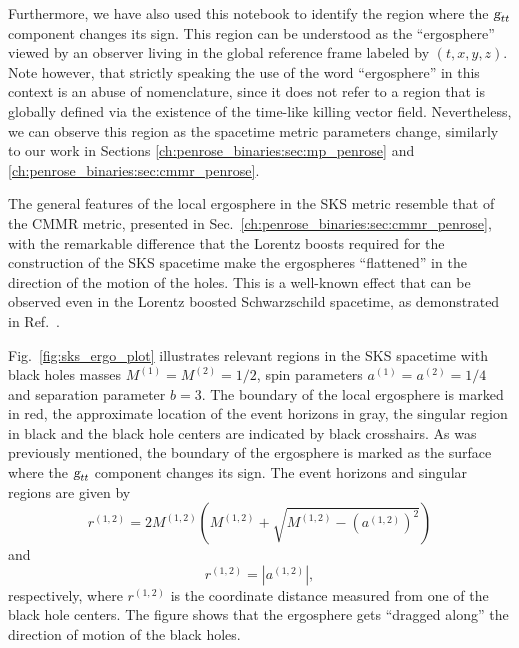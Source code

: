 Furthermore, we have also used this notebook to identify the region where the $\mtrtens{t}{t}$ component changes its sign. This region can be understood as the ``ergosphere'' viewed by an observer living in the global reference frame labeled by $(t,x,y,z)$. Note however, that strictly speaking the use of the word ``ergosphere'' in this context is an abuse of nomenclature, since it does not refer to a region that is globally defined via the existence of the time-like killing vector field. Nevertheless, we can observe this region as the spacetime metric parameters change, similarly to our work in Sections \ref{ch:penrose_binaries:sec:mp_penrose} and \ref{ch:penrose_binaries:sec:cmmr_penrose}.

The general features of the local ergosphere in the \ac{SKS} metric resemble that of the \ac{CMMR} metric, presented in Sec.~\ref{ch:penrose_binaries:sec:cmmr_penrose}, with the remarkable difference that the Lorentz boosts required for the construction of the \ac{SKS} spacetime make the ergospheres ``flattened'' in the direction of the motion of the holes. This is a well-known effect that can be observed even in the Lorentz boosted Schwarzschild spacetime, as demonstrated in Ref.~\cite{PhysRevD.91.084044}.

Fig.~\ref{fig:sks_ergo_plot} illustrates relevant regions in the \ac{SKS} spacetime with black holes masses $M^{(1)} = M^{(2)} = 1/2$, spin parameters $a^{(1)} = a^{(2)} = 1/4$ and separation parameter $b = 3$. The boundary of the local ergosphere is marked in red, the approximate location of the event horizons in gray, the singular region in black and the black hole centers are indicated by black crosshairs. As was previously mentioned, the boundary of the ergosphere is marked as the surface where the $\mtrtens{t}{t}$ component changes its sign. The event horizons and singular regions are given by~\cite{Armengol:2021shd}
%
\begin{equation}
  r^{(1,2)} = 2 M^{(1,2)} \left( M^{(1,2)} + \sqrt{M^{(1,2)} - \left(a^{(1,2)}\right)^2} \right)
  \label{eq:arbitrary_penrose_sks_keplerian_approx_horizons}
\end{equation}
%
and
%
\begin{equation}
  r^{(1,2)} = \left| a^{(1,2)} \right|,
  \label{eq:arbitrary_penrose_sks_keplerian_approx_singularities}
\end{equation}
%
respectively, where $r^{(1,2)}$ is the coordinate distance measured from one of the black hole centers. The figure shows that the ergosphere gets ``dragged along'' the direction of motion of the black holes.

